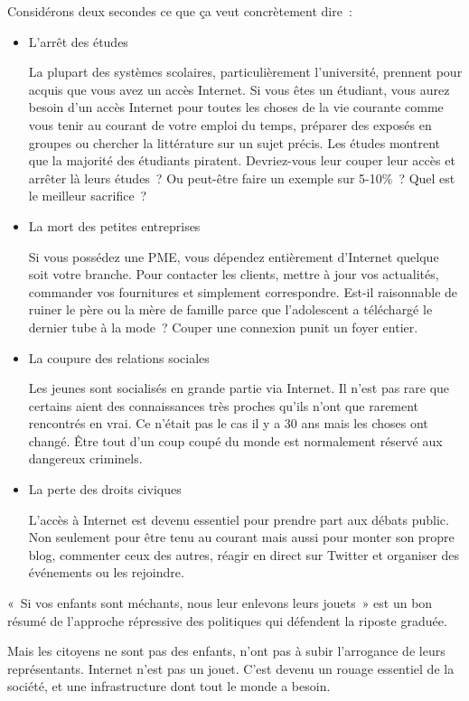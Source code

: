 Considérons deux secondes ce que ça veut concrètement dire~:

\begin{itemize}
\item 
L’arrêt des études

La plupart des systèmes scolaires, particulièrement l’université, prennent pour acquis que vous avez
un accès Internet. Si vous êtes un étudiant, vous aurez besoin d’un accès Internet pour toutes les
choses de la vie courante comme vous tenir au courant de votre emploi du temps, préparer des
exposés en groupes ou chercher la littérature sur un sujet précis. Les études montrent que la
majorité des étudiants piratent. Devriez-vous leur couper leur accès et arrêter là leurs études~? Ou
peut-être faire un exemple sur 5-10\%~? Quel est le meilleur sacrifice~?

\item 
La mort des petites entreprises

Si vous possédez une PME, vous dépendez entièrement d’Internet quelque soit votre branche. Pour
contacter les clients, mettre à jour vos actualités, commander vos fournitures et simplement
correspondre. Est-il raisonnable de ruiner le père ou la mère de famille parce que l’adolescent a
téléchargé le dernier tube à la mode~? Couper une connexion punit un foyer entier.
\item 
La coupure des relations sociales

Les jeunes sont socialisés en grande partie via Internet. Il n’est pas rare que certains aient des
connaissances très proches qu’ils n’ont que rarement rencontrés en vrai. Ce n’était pas le cas il y
a 30 ans mais les choses ont changé. Être tout d’un coup coupé du monde est normalement réservé aux
dangereux criminels.
\item 
La perte des droits civiques

L’accès à Internet est devenu essentiel pour prendre part aux débats public. Non seulement pour être
tenu au courant mais aussi pour monter son propre blog, commenter ceux des autres, réagir en direct
sur Twitter et organiser des événements ou les rejoindre.\end{itemize}

«~Si vos enfants sont méchants, nous leur enlevons leurs jouets~» est un bon résumé de l’approche
répressive des politiques qui défendent la riposte graduée.

Mais les citoyens ne sont pas des enfants, n’ont pas à subir l’arrogance de leurs représentants.
Internet n’est pas un jouet. C’est devenu un rouage essentiel de la société, et une infrastructure
dont tout le monde a besoin.

